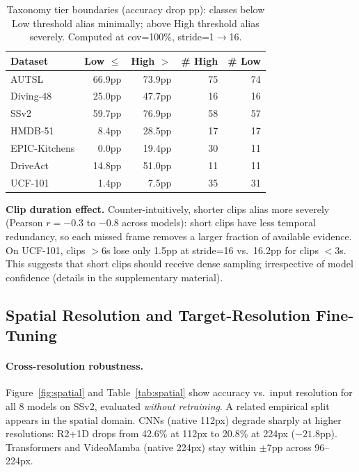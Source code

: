 \documentclass[runningheads]{llncs}
\newcommand{\tabtight}{\setlength{\tabcolsep}{3.5pt}\renewcommand{\arraystretch}{1.10}}
\begin{document}
\begin{table}[t]
\centering
\caption{Taxonomy tier boundaries (accuracy drop pp): classes below Low threshold alias minimally; above High threshold alias severely. Computed at cov=100\%, stride=1$\to$16.}
\label{tab:taxonomy_thresholds}
\scriptsize\tabtight
\begin{tabular}{l r r r r}
\toprule
Dataset & Low $\leq$ & High $>$ & \# High & \# Low \\
\midrule
AUTSL         & 66.9pp & 73.9pp & 75 & 74 \\
Diving-48     & 25.0pp & 47.7pp & 16 & 16 \\
SSv2          & 59.7pp & 76.9pp & 58 & 57 \\
HMDB-51       &  8.4pp & 28.5pp & 17 & 17 \\
EPIC-Kitchens &  0.0pp & 19.4pp & 30 & 11 \\
DriveAct      & 14.8pp & 51.0pp & 11 & 11 \\
UCF-101       &  1.4pp &  7.5pp & 35 & 31 \\
\bottomrule
\end{tabular}
\end{table}

\textbf{Clip duration effect.} Counter-intuitively, shorter clips alias more severely (Pearson $r=-0.3$ to $-0.8$ across models): short clips have less temporal redundancy, so each missed frame removes a larger fraction of available evidence. On UCF-101, clips $>$6s lose only 1.5pp at stride=16 vs.\ 16.2pp for clips $<$3s. This suggests that short clips should receive dense sampling irrespective of model confidence (details in the supplementary material).

\subsection{Spatial Resolution and Target-Resolution Fine-Tuning}
\label{sec:results_spatial}

\paragraph{Cross-resolution robustness.}
Figure~\ref{fig:spatial} and Table~\ref{tab:spatial} show accuracy vs.\ input resolution for all 8 models on SSv2, evaluated \emph{without retraining}. A related empirical split appears in the spatial domain. CNNs (native 112px) degrade sharply at higher resolutions: R2+1D drops from 42.6\% at 112px to 20.8\% at 224px ($-21.8$pp). Transformers and VideoMamba (native 224px) stay within $\pm$7pp across 96--224px.
\end{document}
